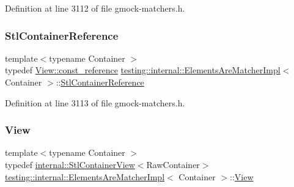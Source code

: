 Definition at line 3112 of file gmock-\/matchers.\+h.

\mbox{\label{classtesting_1_1internal_1_1ElementsAreMatcherImpl_ad5d20c1aa6e8c06c82fe3ac4d68c2278}} 
\subsubsection{\texorpdfstring{Stl\+Container\+Reference}{StlContainerReference}}
{\footnotesize\ttfamily template$<$typename Container $>$ \\
typedef \hyperlink{classtesting_1_1internal_1_1StlContainerView_a9cd4f6ed689b3938cdb7b3c4cbf1b36b}{View\+::const\+\_\+reference} \hyperlink{classtesting_1_1internal_1_1ElementsAreMatcherImpl}{testing\+::internal\+::\+Elements\+Are\+Matcher\+Impl}$<$ Container $>$\+::\hyperlink{classtesting_1_1internal_1_1ElementsAreMatcherImpl_ad5d20c1aa6e8c06c82fe3ac4d68c2278}{Stl\+Container\+Reference}}



Definition at line 3113 of file gmock-\/matchers.\+h.

\mbox{\label{classtesting_1_1internal_1_1ElementsAreMatcherImpl_a68c37c6cc56c047323543044445a5022}} 
\subsubsection{\texorpdfstring{View}{View}}
{\footnotesize\ttfamily template$<$typename Container $>$ \\
typedef \hyperlink{classtesting_1_1internal_1_1StlContainerView}{internal\+::\+Stl\+Container\+View}$<$Raw\+Container$>$ \hyperlink{classtesting_1_1internal_1_1ElementsAreMatcherImpl}{testing\+::internal\+::\+Elements\+Are\+Matcher\+Impl}$<$ Container $>$\+::\hyperlink{classtesting_1_1internal_1_1ElementsAreMatcherImpl_a68c37c6cc56c047323543044445a5022}{View}}



